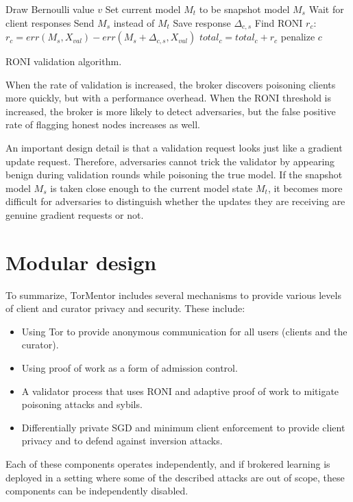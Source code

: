 \begin{algorithm}[h]
   {
    Draw Bernoulli value $v$\;
     {
      Set current model $M_t$ to be snapshot model $M_s$\;
      Wait for client responses\;
    }
     {
      Send $M_s$ instead of $M_t$\;
      Save response $\Delta_{c,s}$
    }
     {
       Find RONI $r_c$:
       $r_c = err(M_s, X_{val}) - err(M_s + \Delta_{c,s}, X_{val})$\; 
       $total_c = total_c + r_c$\;
       {
        penalize $c$\;
      }
    }
  }
  \caption{RONI validation algorithm. \label{alg:roni}}
\end{algorithm}

When the rate of validation is increased, the broker discovers
poisoning clients more quickly, but with a performance overhead. When
the RONI threshold is increased, the broker is more likely to detect
adversaries, but the false positive rate of flagging honest nodes
increases as well.

An important design detail is that a validation request looks just
like a gradient update request. Therefore, adversaries cannot
trick the validator by appearing benign during validation rounds while
poisoning the true model. If the snapshot model $M_s$ is taken close
enough to the current model state $M_t$, it becomes more difficult for
adversaries to distinguish whether the updates they are receiving are
genuine gradient requests or not.

\section{Modular design}

To summarize, TorMentor includes several mechanisms to provide
various levels of client and curator privacy and security. These
include:
\begin{itemize}[label=$\star$]
    \item Using Tor to provide anonymous communication for all users 
    (clients and the curator).
    \item Using proof of work as a form of admission control.
    \item A validator process that uses RONI and adaptive proof of work
        to mitigate poisoning attacks and sybils.
    \item Differentially private SGD and minimum client enforcement to
        provide client privacy and to defend against inversion attacks.
\end{itemize}

Each of these components operates independently, and if brokered
learning is deployed in a setting where some of the described attacks
are out of scope, these components can be independently disabled. %
